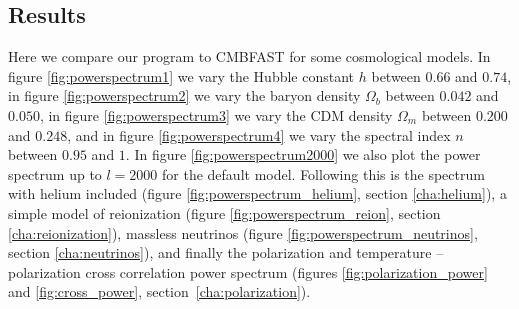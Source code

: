 \documentclass[twocolumn,nofootinbib,amsmath,amssymb]{revtex4}
\begin{document}
\begin{widetext}
\section{Results}
\label{cha:results}

Here we compare our program to CMBFAST for some cosmological models. In figure
\ref{fig:powerspectrum1} we vary the Hubble constant $h$ between $0.66$ and
$0.74$, in figure \ref{fig:powerspectrum2} we vary the baryon density
$\Omega_b$ between $0.042$ and $0.050$, in figure \ref{fig:powerspectrum3} we
vary the CDM density $\Omega_m$ between $0.200$ and $0.248$, and in figure
\ref{fig:powerspectrum4} we vary the spectral index $n$ between $0.95$ and $1$.
In figure \ref{fig:powerspectrum2000} we also plot the power spectrum up to
$l=2000$ for the default model. Following this is the spectrum with helium
included (figure \ref{fig:powerspectrum_helium}, section \ref{cha:helium}), a
simple model of reionization (figure \ref{fig:powerspectrum_reion}, section
\ref{cha:reionization}), massless neutrinos (figure
\ref{fig:powerspectrum_neutrinos}, section \ref{cha:neutrinos}), and finally
the polarization and temperature -- polarization cross correlation power
spectrum (figures \ref{fig:polarization_power} and \ref{fig:cross_power},
section~\ref{cha:polarization}).


\end{widetext}
\end{document}
